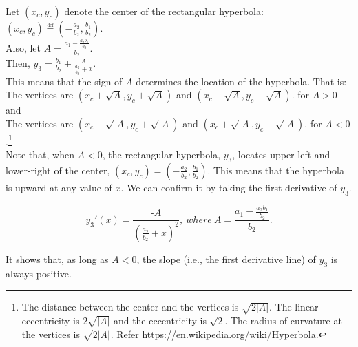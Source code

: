 \documentclass[11pt, a4paper]{article}
\begin{document}
\noindent
Let $(x_c, y_c)$ denote the center of the rectangular hyperbola: $(x_c, y_c) \overset{\underset{\mathrm{def}}{}}{=} (-\frac{a_2}{b_2}, \frac{b_1}{b_2})$.\\
\noindent
Also, let $A = \frac{a_1-\frac{a_2 b_1}{b_2}}{b_2}$. \\
Then, $y_3= \frac{b_1}{b_2}+\frac{A}{\frac{a_2}{b_2}+x}$.\\

\noindent
This means that the sign of $A$ determines the location of the hyperbola.
That is:\\
The vertices are $(x_c+\sqrt{A}, y_c+\sqrt{A})$ and $(x_c-\sqrt{A}, y_c-\sqrt{A})$. for $A>0$ and\\
The vertices are $(x_c-\sqrt{\mbox{-}A}, y_c+\sqrt{\mbox{-}A})$ and $(x_c+\sqrt{\mbox{-}A}, y_c-\sqrt{\mbox{-}A})$. for $A<0$.\footnote{The distance between the center and the vertices is $\sqrt{2|A|}$. The linear eccentricity is $2\sqrt{|A|}$ and the eccentricity is $\sqrt{2}$. The radius of curvature at the vertices is $\sqrt{2|A|}$. Refer https://en.wikipedia.org/wiki/Hyperbola.}\\

\noindent
Note that, when $A<0$, the rectangular hyperbola, $y_3$, locates upper-left and lower-right of the center, $(x_c, y_c) = (-\frac{a_2}{b_2}, \frac{b_1}{b_2})$. This means that the hyperbola is upward at any value of $x$. We can confirm it by  taking the first derivative of $y_3$. 

\noindent
\begin{equation}
\label{eq:deriv}
y_3'(x)=\frac{\mbox{-}A}{(\frac{a_2}{b_2}+x)^2},~where~A = \frac{a_1-\frac{a_2 b_1}{b_2}}{b_2}.
\end{equation}


\noindent
It shows that, as long as $A<0$, the slope (i.e., the first derivative line) of $y_3$ is always positive.\\

\end{document}
